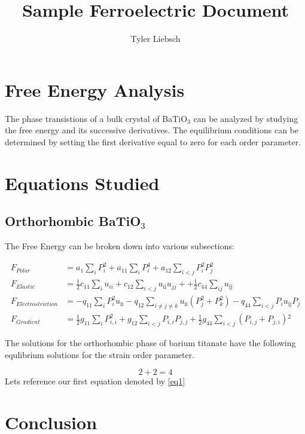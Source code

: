 \documentclass{article}
\title{Sample Ferroelectric Document}
\author{Tyler Liebsch}
\begin{document}
\linespread{1.3}
\maketitle

\section{Free Energy Analysis}

The phase transistions of a bulk crystal of BaTiO$_3$ can be analyzed by studying the free energy and its successive derivatives.  The equilibrium conditions can be determined by setting the first derivative equal to zero for each order parameter.

\section{Equations Studied}
\label{sec:Equations}

\subsection{Orthorhombic BaTiO$_3$}

The Free Energy can be broken down into various subsections:

\begin{align}
 F_{Polar} & =a_1 \sum _i P_i^2+a_{11} \sum _i P_i^4 + a_{12} \sum _{i<j} P_i^2 P_j^2 \\
 F_{Elastic} &= \frac{1}{2} c_{11} \sum _{i} u_{ii} + c_{12} \sum _{i<j} u_{\text{ii}} u_{j j}++\frac{1}{2} c_{44} \sum _{i j} u_{\text{ij}} \\
 F_{Electrostriction}& = -q_{11} \sum _i P_i^2 u_{\text{ii}}-q_{12} \sum _{i\neq j\neq k} u_{\text{ii}} \left(P_j^2+P_k^2\right)-q_{44} \sum _{i<j} P_i u_{\text{ij}} P_j \\
 F_{Gradient} &=\frac{1}{2} g_{11} \sum _i P_{i,i}^2+g_{12} \sum _{i<j} P_{i,i} P_{j,j}+\frac{1}{2} g_{44} \sum _{i<j} \left(P_{i,j}+P_{j,i}\right){}^2
\end{align}

The solutions for the orthorhombic phase of barium titanate have the following equlibrium solutions for the strain order parameter.
\vspace{12pt}


\begin{equation}
2+2=4
\label{eq1}
\end{equation}
Lets reference our first equation denoted by \eqref{eq1}

\section{Conclusion}
\end{document}
